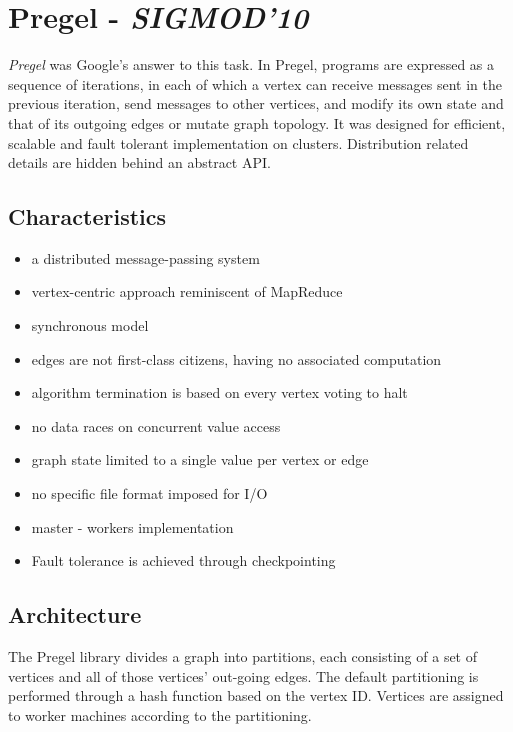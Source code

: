 \documentclass[letterpaper,twocolumn,10pt]{article}
\begin{document}
\section{Pregel - \textit{SIGMOD'10}}
\textit{Pregel} was Google's answer to this task. In Pregel, programs are expressed as a sequence of iterations, in each of which a vertex can receive messages sent in the previous iteration, send messages to other vertices, and modify its own state and that of its outgoing edges or mutate graph topology. It was designed for efficient, scalable and fault tolerant implementation on clusters. Distribution related details are hidden behind an abstract API.


\subsection{Characteristics}
\begin{itemize}
\item a distributed message-passing system
\item vertex-centric approach reminiscent of MapReduce
\item synchronous model
\item edges are not first-class citizens, having no associated computation
\item algorithm termination is based on every vertex voting to halt
\item no data races on concurrent value access
\item graph state limited to a single value per vertex or edge
\item no specific file format imposed for I/O
\item master - workers implementation
\item Fault tolerance is achieved through checkpointing
\end{itemize}

\subsection{Architecture}
The Pregel library divides a graph into partitions, each consisting of a set of vertices and all of those vertices' out-going edges. The default partitioning is performed through a hash function based on the vertex ID. Vertices are assigned to worker machines according to the partitioning.\\
\end{document}
